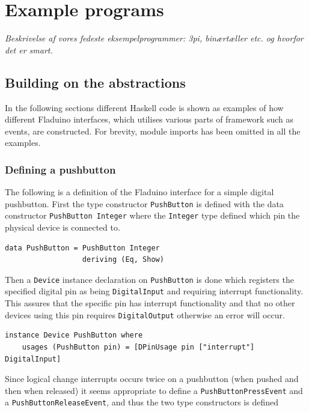 \documentclass[a4paper, oneside, final]{memoir}
\begin{document}
\chapter{Example programs}

\textit{Beskrivelse af vores fedeste eksempelprogrammer: 3pi,
  binærtæller etc. og hvorfor det er smart.}

\section{Building on the abstractions}

In the following sections different Haskell code is shown as examples of how
different Fladuino interfaces, which utilises various parts of framework such as
events, are constructed. For brevity, module imports has been omitted in all the
examples.

\subsection{Defining a pushbutton}
\label{sec:pushbuttondef}

The following is a definition of the Fladuino interface for a simple digital
pushbutton. First the type constructor \texttt{PushButton} is defined with the
data constructor \texttt{PushButton Integer} where the \texttt{Integer} type
defined which pin the physical device is connected to.

\begin{verbatim}
data PushButton = PushButton Integer
                  deriving (Eq, Show)
\end{verbatim}

\noindent
Then a \texttt{Device} instance declaration on \texttt{PushButton} is done which
registers the specified digital pin as being \texttt{DigitalInput} and requiring
interrupt functionality. This assures that the specific pin has interrupt
functionality and that no other devices using this pin requires
\texttt{DigitalOutput} otherwise an error will occur.

\begin{verbatim}
instance Device PushButton where
    usages (PushButton pin) = [DPinUsage pin ["interrupt"] DigitalInput]
\end{verbatim}

Since logical change interrupts occurs twice on a pushbutton (when
pushed and then when released) it seems appropriate to define a
\texttt{PushButtonPressEvent} and a \texttt{PushButtonReleaseEvent},
and thus the two type constructors is defined
\end{document}
